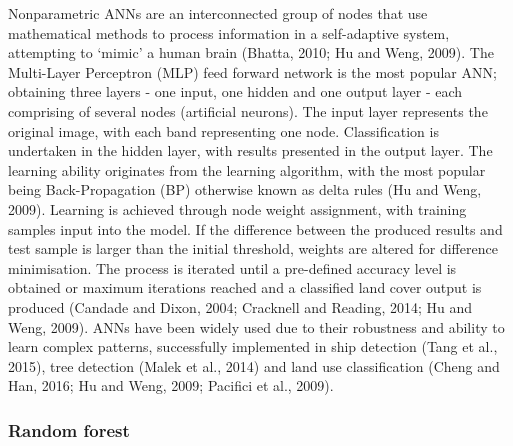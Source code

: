 \documentclass[]{book}
\begin{document}
Nonparametric ANNs are an interconnected group of nodes that use
mathematical methods to process information in a self-adaptive system,
attempting to `mimic' a human brain (Bhatta, 2010; Hu and Weng, 2009).
The Multi-Layer Perceptron (MLP) feed forward network is the most
popular ANN; obtaining three layers - one input, one hidden and one
output layer - each comprising of several nodes (artificial neurons).
The input layer represents the original image, with each band
representing one node. Classification is undertaken in the hidden layer,
with results presented in the output layer. The learning ability
originates from the learning algorithm, with the most popular being
Back-Propagation (BP) otherwise known as delta rules (Hu and Weng,
2009). Learning is achieved through node weight assignment, with
training samples input into the model. If the difference between the
produced results and test sample is larger than the initial threshold,
weights are altered for difference minimisation. The process is iterated
until a pre-defined accuracy level is obtained or maximum iterations
reached and a classified land cover output is produced (Candade and
Dixon, 2004; Cracknell and Reading, 2014; Hu and Weng, 2009). ANNs have
been widely used due to their robustness and ability to learn complex
patterns, successfully implemented in ship detection (Tang et al.,
2015), tree detection (Malek et al., 2014) and land use classification
(Cheng and Han, 2016; Hu and Weng, 2009; Pacifici et al., 2009).

\subsubsection{Random forest}\label{random-forest}
\end{document}
